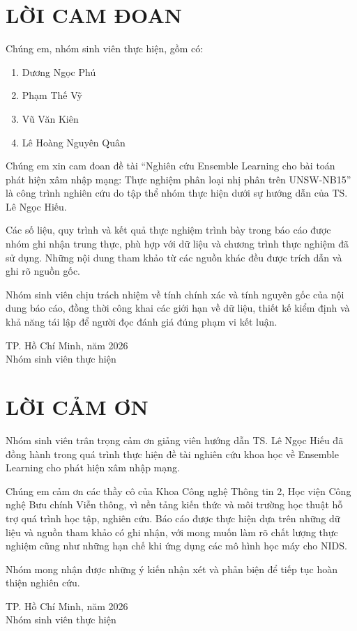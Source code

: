 \chapter*{LỜI CAM ĐOAN}

Chúng em, nhóm sinh viên thực hiện, gồm có:

\begin{enumerate}
\setlength{\itemsep}{4pt}
\setlength{\parsep}{0pt}
\item Dương Ngọc Phú
\item Phạm Thế Vỹ
\item Vũ Văn Kiên
\item Lê Hoàng Nguyên Quân
\end{enumerate}

Chúng em xin cam đoan đề tài “Nghiên cứu Ensemble Learning cho bài toán phát hiện xâm nhập mạng: Thực nghiệm phân loại nhị phân trên UNSW-NB15” là công trình nghiên cứu do tập thể nhóm thực hiện dưới sự hướng dẫn của TS. Lê Ngọc Hiếu.

Các số liệu, quy trình và kết quả thực nghiệm trình bày trong báo cáo được nhóm ghi nhận trung thực, phù hợp với dữ liệu và chương trình thực nghiệm đã sử dụng. Những nội dung tham khảo từ các nguồn khác đều được trích dẫn và ghi rõ nguồn gốc.

Nhóm sinh viên chịu trách nhiệm về tính chính xác và tính nguyên gốc của nội dung báo cáo, đồng thời công khai các giới hạn về dữ liệu, thiết kế kiểm định và khả năng tái lập để người đọc đánh giá đúng phạm vi kết luận.

\vspace{1.8cm}
\begin{flushright}
TP. Hồ Chí Minh, năm 2026\\[10pt]
Nhóm sinh viên thực hiện
\end{flushright}

\clearpage
\chapter*{LỜI CẢM ƠN}
Nhóm sinh viên trân trọng cảm ơn giảng viên hướng dẫn TS. Lê Ngọc Hiếu đã đồng hành trong quá trình thực hiện đề tài nghiên cứu khoa học về Ensemble Learning cho phát hiện xâm nhập mạng.

Chúng em cảm ơn các thầy cô của Khoa Công nghệ Thông tin 2, Học viện Công nghệ Bưu chính Viễn thông, vì nền tảng kiến thức và môi trường học thuật hỗ trợ quá trình học tập, nghiên cứu. Báo cáo được thực hiện dựa trên những dữ liệu và nguồn tham khảo có ghi nhận, với mong muốn làm rõ chất lượng thực nghiệm cũng như những hạn chế khi ứng dụng các mô hình học máy cho NIDS.

Nhóm mong nhận được những ý kiến nhận xét và phản biện để tiếp tục hoàn thiện nghiên cứu.

\vspace{1.8cm}
\begin{flushright}
TP. Hồ Chí Minh, năm 2026\\[10pt]
Nhóm sinh viên thực hiện
\end{flushright}
